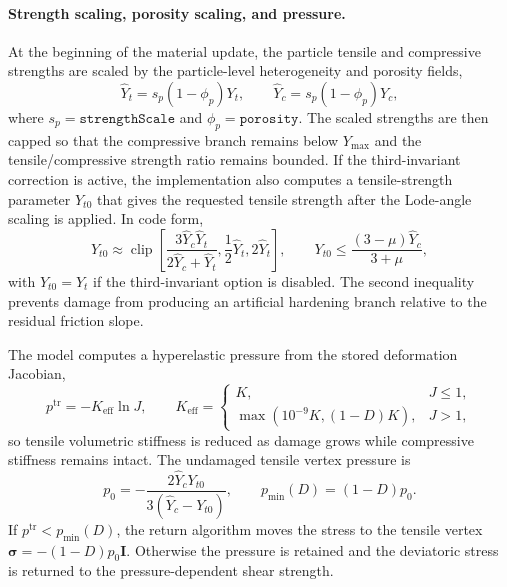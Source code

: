 \paragraph{Strength scaling, porosity scaling, and pressure.}
At the beginning of the material update, the particle tensile and compressive strengths are scaled by the particle-level heterogeneity and porosity fields,
\begin{equation}
  \widehat{Y}_t = s_p(1-\phi_p)Y_t,
  \qquad
  \widehat{Y}_c = s_p(1-\phi_p)Y_c,
  \label{eq:ceramic-strength-porosity-scale}
\end{equation}
where \(s_p=\texttt{strengthScale}\) and \(\phi_p=\texttt{porosity}\).  The scaled strengths are then capped so that the compressive branch remains below \(Y_{\max}\) and the tensile/compressive strength ratio remains bounded.  If the third-invariant correction is active, the implementation also computes a tensile-strength parameter \(Y_{t0}\) that gives the requested tensile strength after the Lode-angle scaling is applied.  In code form,
\begin{equation}
  Y_{t0}\approx
  \operatorname{clip}\left[
    \frac{3\widehat{Y}_c\widehat{Y}_t}{2\widehat{Y}_c+\widehat{Y}_t},
    \frac{1}{2}\widehat{Y}_t,
    2\widehat{Y}_t
  \right],
  \qquad
  Y_{t0}\le \frac{(3-\mu)\widehat{Y}_c}{3+\mu},
  \label{eq:ceramic-yt0-scaling}
\end{equation}
with \(Y_{t0}=\widehat{Y}_t\) if the third-invariant option is disabled.  The second inequality prevents damage from producing an artificial hardening branch relative to the residual friction slope.

The model computes a hyperelastic pressure from the stored deformation Jacobian,
\begin{equation}
  p^{\mathrm{tr}}=-K_{\mathrm{eff}}\ln J,
  \qquad
  K_{\mathrm{eff}}=\begin{cases}
    K, & J\le 1,\\
    \max(10^{-9}K,(1-D)K), & J>1,
  \end{cases}
  \label{eq:ceramic-pressure-update}
\end{equation}
so tensile volumetric stiffness is reduced as damage grows while compressive stiffness remains intact.  The undamaged tensile vertex pressure is
\begin{equation}
  p_0=-\frac{2\widehat{Y}_cY_{t0}}{3(\widehat{Y}_c-Y_{t0})},
  \qquad
  p_{\min}(D)=(1-D)p_0.
  \label{eq:ceramic-vertex-pressure}
\end{equation}
If \(p^{\mathrm{tr}}<p_{\min}(D)\), the return algorithm moves the stress to the tensile vertex \(\boldsymbol{\sigma}=-(1-D)p_0\mathbf{I}\).  Otherwise the pressure is retained and the deviatoric stress is returned to the pressure-dependent shear strength.

